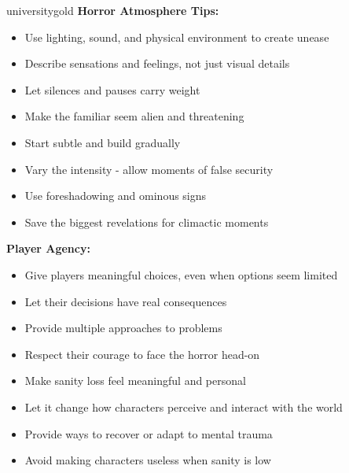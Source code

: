 \documentclass[11pt]{article}
\begin{document}
\begin{campaignsection}[GM Preparation]{universitygold}
\textbf{Horror Atmosphere Tips:}
\begin{itemize}
    \item Use lighting, sound, and physical environment to create unease
    \item Describe sensations and feelings, not just visual details
    \item Let silences and pauses carry weight
    \item Make the familiar seem alien and threatening
    \item Start subtle and build gradually
    \item Vary the intensity - allow moments of false security
    \item Use foreshadowing and ominous signs
    \item Save the biggest revelations for climactic moments
\end{itemize}

\textbf{Player Agency:}
\begin{itemize}
    \item Give players meaningful choices, even when options seem limited
    \item Let their decisions have real consequences
    \item Provide multiple approaches to problems
    \item Respect their courage to face the horror head-on
    \item Make sanity loss feel meaningful and personal
    \item Let it change how characters perceive and interact with the world
    \item Provide ways to recover or adapt to mental trauma
    \item Avoid making characters useless when sanity is low
\end{itemize}
\end{campaignsection}

\newpage
\end{document}
